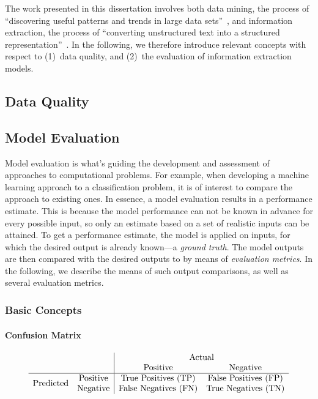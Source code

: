 The work presented in this dissertation involves both data mining, the process of ``discovering useful patterns and trends in large data sets''~\cite{Larose2014}, and information extraction, the process of ``converting unstructured text into a structured representation''~\cite{Aggarwal2018}. In the following, we therefore introduce relevant concepts with respect to (1)~data quality, and (2)~the evaluation of information extraction models.

\subsection{Data Quality}


\subsection{Model Evaluation}

Model evaluation is what's guiding the development and assessment of approaches to computational problems. For example, when developing a machine learning approach to a classification problem, it is of interest to compare the approach to existing ones. In essence, a model evaluation results in a performance estimate. This is because the model performance can not be known in advance for every possible input, so only an estimate based on a set of realistic inputs can be attained.
To get a performance estimate, the model is applied on inputs, for which the desired output is already known---a \emph{ground truth}. The model outputs are then compared with the desired outputs to by means of \emph{evaluation metrics}. In the following, we describe the means of such output comparisons, as well as several evaluation metrics.

\subsubsection{Basic Concepts}

\paragraph{Confusion Matrix}

\begin{equation*}
\begin{array}{cc|cc}
    & \ & \multicolumn{2}{c}{\text{Actual}} \\
    & \ & \text{Positive} & \text{Negative} \\
    \hline
    \multirow{2}{*}{Predicted} & \text{Positive} & \text{True Positives (TP)} & \text{False Positives (FP)} \\
     & \text{Negative} & \text{False Negatives (FN)} & \text{True Negatives (TN)} \\
\end{array}
\end{equation*}


